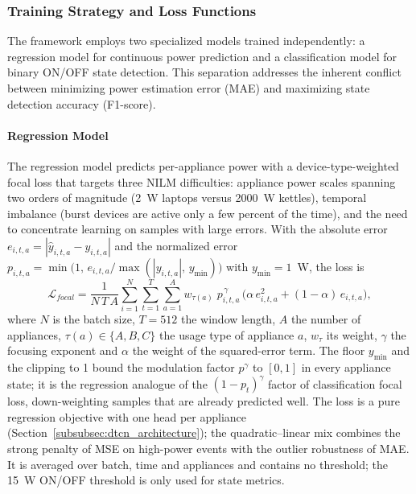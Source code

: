 \documentclass[fleqn,10pt]{wlscirep}
\begin{document}
\subsubsection{Training Strategy and Loss Functions}
\label{subsubsec:training_strategy}

The framework employs two specialized models trained independently: a regression model for continuous power prediction and a classification model for binary ON/OFF state detection. This separation addresses the inherent conflict between minimizing power estimation error (MAE) and maximizing state detection accuracy (F1-score).

\paragraph{Regression Model} The regression model predicts per-appliance power with a device-type-weighted focal loss that targets three NILM difficulties: appliance power scales spanning two orders of magnitude (2~W laptops versus 2000~W kettles), temporal imbalance (burst devices are active only a few percent of the time), and the need to concentrate learning on samples with large errors. With the absolute error $e_{i,t,a}=|\hat{y}_{i,t,a}-y_{i,t,a}|$ and the normalized error $p_{i,t,a}=\min\!\big(1,\,e_{i,t,a}/\max(|y_{i,t,a}|,\,y_{\min})\big)$ with $y_{\min}=1$~W, the loss is 
\begin{equation}
\label{eq:focal_loss}
\mathcal{L}_{focal} = \frac{1}{N\,T\,A}\sum_{i=1}^{N}\sum_{t=1}^{T}\sum_{a=1}^{A} w_{\tau(a)}\; p_{i,t,a}^{\,\gamma}\,\Big(\alpha\, e_{i,t,a}^{2} + (1-\alpha)\, e_{i,t,a}\Big),
\end{equation}
where $N$ is the batch size, $T=512$ the window length, $A$ the number of appliances, $\tau(a)\in\{A,B,C\}$ the usage type of appliance $a$, $w_\tau$ its weight, $\gamma$ the focusing exponent and $\alpha$ the weight of the squared-error term. The floor $y_{\min}$ and the clipping to 1 bound the modulation factor $p^{\gamma}$ to $[0,1]$ in every appliance state; it is the regression analogue of the $(1-p_t)^{\gamma}$ factor of classification focal loss, down-weighting samples that are already predicted well. The loss is a pure regression objective with one head per appliance (Section~\ref{subsubsec:dtcn_architecture}); the quadratic--linear mix combines the strong penalty of MSE on high-power events with the outlier robustness of MAE. It is averaged over batch, time and appliances and contains no threshold; the 15~W ON/OFF threshold is only used for state metrics.
\end{document}

